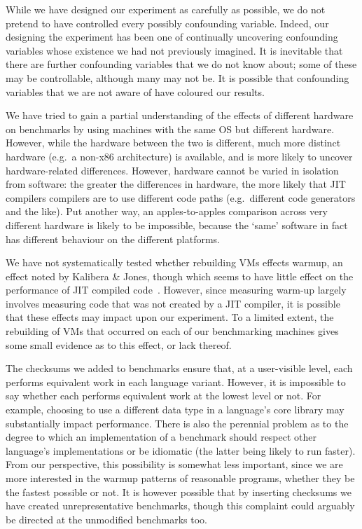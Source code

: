 \documentclass[preprint,numbers,10pt]{sigplanconf}
\newcommand{\kalibera}{Kalibera \& Jones\xspace}
\begin{document}
While we have designed our experiment as carefully as possible, we do not
pretend to have controlled every possibly confounding variable. Indeed, our
designing the experiment has been one of continually uncovering
confounding variables whose existence we had not previously imagined. It
is inevitable that there are further confounding variables that we
do not know about; some of these may be controllable, although many may not be.
It is possible that confounding variables that we are not aware of have
coloured our results.

We have tried to gain a partial understanding of the effects of different
hardware on benchmarks by using machines with the same OS but
different hardware. However, while the hardware between the two is
different, much more distinct hardware (e.g.~a non-x86 architecture) is
available, and is more likely to uncover hardware-related differences.
However, hardware cannot be varied in isolation from software:
the greater the differences in hardware, the more likely that JIT compilers
compilers are to use different code paths (e.g.~different code generators and
the like). Put another way, an apples-to-apples comparison across very different
hardware is likely to be impossible, because the `same' software in fact has
different behaviour on the different platforms.

We have not systematically tested whether rebuilding VMs effects warmup, an
effect noted by \kalibera, though which seems to have little effect on
the performance of JIT compiled code~\cite{barrett15approaches}. However, since measuring warm-up largely
involves measuring code that was not created by a JIT compiler, it is possible
that these effects may impact upon our experiment. To a limited extent, the
rebuilding of VMs that occurred on each of our benchmarking machines gives
some small evidence as to this effect, or lack thereof.

The checksums we added to benchmarks ensure that, at a user-visible level, each
performs equivalent work in each language variant. However, it is impossible to
say whether each performs equivalent work at the lowest level or not. For
example, choosing to use a different data type in a language's core library may
substantially impact performance. There is also the perennial problem as to the
degree to which an implementation of a benchmark should respect other
language's implementations or be idiomatic (the latter being likely to
run faster). From our perspective, this possibility is somewhat less important,
since we are more interested in the warmup patterns of reasonable programs,
whether they be the fastest possible or not. It is however possible that by
inserting checksums we have created unrepresentative benchmarks, though
this complaint could arguably be directed at the unmodified benchmarks too.
\end{document}
